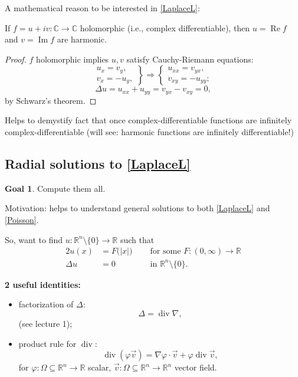 \documentclass[12pt]{article}
\DeclareMathOperator{\diver}{div}
\DeclareMathOperator{\Real}{Re}
\DeclareMathOperator{\Img}{Im}
\theoremstyle{definition}
\newtheorem*{goal}{Goal}
\begin{document}
A mathematical reason to be interested in \eqref{LaplaceL}:

If $f=u+iv:\mathbb C\rightarrow\mathbb C$ holomorphic (i.e., complex differentiable), then $u=\Real f$ and $v=\Img f$ are harmonic.

\begin{proof}
$f$ holomorphic implies $u,v$ satisfy Cauchy-Riemann equations:
\[\left.\begin{array}{r}u_x=v_y,\\v_x=-u_y,\end{array}\right\}\Rightarrow\left\{\begin{array}{l}u_{xx}=v_{yx},\\v_{xy}=-u_{yy};\end{array}\right.\]
\[\Delta u=u_{xx}+u_{yy}=v_{yx}-v_{xy}=0,\]
by Schwarz's theorem.
\end{proof}

Helps to demystify fact that once complex-differentiable functions are infinitely complex-differentiable (will see: harmonic functions are infinitely differentiable!)

\subsection{Radial solutions to \texorpdfstring{\eqref{LaplaceL}}{(L)}}
\begin{goal}
Compute them all.
\end{goal}

Motivation: helps to understand general solutions to both \eqref{LaplaceL} and \eqref{Poisson}.

So, want to find $u:\mathbb R^n\setminus\{0\}\rightarrow\mathbb R$ such that
\begin{alignat*}{2}
u(x)&=F\big(|x|\big)\ &&\text{ for some }F:(0,\infty)\rightarrow\mathbb R\\
\Delta u&=0&&\text{ in }\mathbb R^n\setminus\{0\}.
\end{alignat*}

\textbf{2 useful identities:}
\begin{itemize}
\item factorization of $\Delta$:
\[\Delta=\diver\nabla,\]
(see lecture 1);
\item product rule for $\diver$:
\[\diver(\varphi\vec v)=\nabla\varphi\cdot\vec v+\varphi\diver\vec v,\]
for $\varphi:\Omega\subseteq\mathbb R^n\rightarrow\mathbb R$ scalar, $\vec v:\Omega\subseteq\mathbb R^n\rightarrow\mathbb R^n$ vector field.
\end{itemize}
\end{document}
